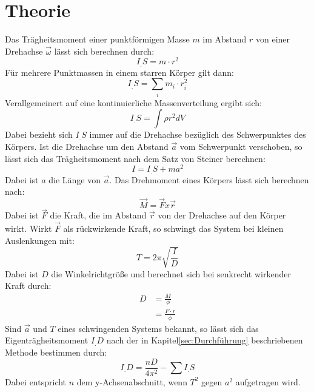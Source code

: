 
\section{Theorie}
\label{sec:Theorie}

Das Trägheitsmoment einer punktförmigen Masse $m$ im Abstand $r$ von einer Drehachse $\vec{\omega}$ lässt sich berechnen durch:
\begin{equation}
I_.S = m\cdot r^2 
\end{equation}
Für mehrere Punktmassen in einem starren Körper gilt dann:
\begin{equation}
I_.S = \sum_i m_i\cdot r_i^2
\end{equation}
Verallgemeinert auf eine kontinuierliche Massenverteilung ergibt sich:
\begin{equation}
I_.S = \int \rho r^2 dV \label{eq:I_S}
\end{equation}
Dabei bezieht sich $I_.S$ immer auf die Drehachse bezüglich des Schwerpunktes des Körpers.  
Ist die Drehachse um den Abstand $\vec{a}$ vom Schwerpunkt verschoben, so lässt sich das Trägheitsmoment nach dem Satz von Steiner berechnen:
\begin{equation}
I = I_.S+m a^2 \label{eq:Satz von Steiner}
\end{equation}
Dabei ist $a$ die Länge von $\vec{a}$. Das Drehmoment eines Körpers lässt sich berechnen nach:
\begin{equation}
\vec{M} = \vec{F}x\vec{r} \label{eq;M}
\end{equation}
Dabei ist $\vec{F}$ die Kraft, die im Abstand $\vec{r}$ von der Drehachse auf den Körper wirkt. Wirkt $\vec{F}$ als rückwirkende Kraft, so schwingt das System bei kleinen Auslenkungen mit:
\begin{equation}
T = 2\pi\sqrt{\frac{I}{D}} \label{eq;M}
\end{equation}
Dabei ist $D$ die Winkelrichtgröße und berechnet sich bei senkrecht wirkender Kraft durch: 
\begin{align}
D 	&= \frac{M}{\phi}\nonumber\\ 
	&= \frac{F\cdot r}{\phi} \label{eq:D}
\end{align}
Sind $\vec{a}$ und $T$ eines schwingenden Systems bekannt, so lässt sich das Eigenträgheitsmoment $I_.D$ nach der in Kapitel\ref{sec:Durchführung} beschriebenen Methode bestimmen durch:
\begin{equation}
I_.D = \frac{nD}{4\pi^2}-\sum I_.S \label{eq:I_D}
\end{equation}
Dabei entspricht $n$ dem y-Achsenabschnitt, wenn $T^2$ gegen $a^2$ aufgetragen wird.